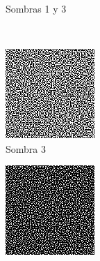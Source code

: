 \begin{figure}[Hp]
\begin{subfigure}[t]{0.3\textwidth}
		\caption{Sombras 1 y 3}
	\end{subfigure}
	\\
	\begin{subfigure}[t]{0.3\textwidth}
		\centering
		\includegraphics[width=\textwidth]{images/shade02}
		\caption{Sombra 3}
	\end{subfigure}
	\hspace{0.5cm}
	\begin{subfigure}[t]{0.3\textwidth}
		\centering
		\includegraphics[width=\textwidth]{images/shade1y2}

\end{subfigure}
\end{figure}
